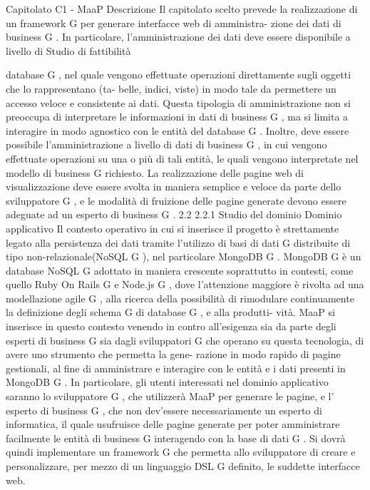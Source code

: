 Capitolato C1 - MaaP
Descrizione
Il capitolato scelto prevede la realizzazione di un framework G per generare interfacce web di amministra-
zione dei dati di business G . In particolare, l’amministrazione dei dati deve essere disponibile a livello di
Studio di fattibilità

database G , nel quale vengono effettuate operazioni direttamente sugli oggetti che lo rappresentano (ta-
belle, indici, viste) in modo tale da permettere un accesso veloce e consistente ai dati. Questa tipologia
di amministrazione non si preoccupa di interpretare le informazioni in dati di business G , ma si limita a
interagire in modo agnostico con le entità del database G .
Inoltre, deve essere possibile l’amministrazione a livello di dati di business G , in cui vengono effettuate
operazioni su una o più di tali entità, le quali vengono interpretate nel modello di business G richiesto.
La realizzazione delle pagine web di visualizzazione deve essere svolta in maniera semplice e veloce da
parte dello sviluppatore G , e le modalità di fruizione delle pagine generate devono essere adeguate ad un
esperto di business G .
2.2
2.2.1
Studio del dominio
Dominio applicativo
Il contesto operativo in cui si inserisce il progetto è strettamente legato alla persistenza dei dati tramite
l’utilizzo di basi di dati G distribuite di tipo non-relazionale(NoSQL G ), nel particolare MongoDB G .
MongoDB G è un database NoSQL G adottato in maniera crescente soprattutto in contesti, come quello
Ruby On Rails G e Node.js G , dove l’attenzione maggiore è rivolta ad una modellazione agile G , alla ricerca
della possibilità di rimodulare continuamente la definizione degli schema G di database G , e alla produtti-
vità.
MaaP si inserisce in questo contesto venendo in contro all’esigenza sia da parte degli esperti di business G
sia dagli sviluppatori G che operano su questa tecnologia, di avere uno strumento che permetta la gene-
razione in modo rapido di pagine gestionali, al fine di amministrare e interagire con le entità e i dati
presenti in MongoDB G .
In particolare, gli utenti interessati nel dominio applicativo saranno lo sviluppatore G , che utilizzerà MaaP
per generare le pagine, e l’ esperto di business G , che non dev’essere necessariamente un esperto di
informatica, il quale usufruisce delle pagine generate per poter amministrare facilmente le entità di
business G interagendo con la base di dati G .
Si dovrà quindi implementare un framework G che permetta allo sviluppatore di creare e personalizzare,
per mezzo di un linguaggio DSL G definito, le suddette interfacce web.
